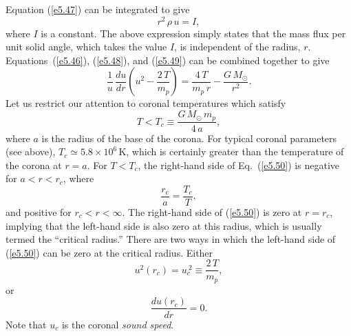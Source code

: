 Equation (\ref{e5.47}) can be integrated to give
\begin{equation}\label{e5.49}
r^2\,\rho\,u = I,
\end{equation}
where $I$ is a constant. The above expression simply states that the mass flux per
unit solid angle, which takes the value $I$, is independent of the radius, $r$.
Equations~(\ref{e5.46}), (\ref{e5.48}), and (\ref{e5.49}) can be combined together to give
\begin{equation}\label{e5.50}
\frac{1}{u} \,\frac{du}{dr}\left(u^2 - \frac{2\,T}{m_p}\right)
= \frac{4\,T}{m_p\,r} - \frac{G\,M_\odot}{r^2}.
\end{equation}
Let us restrict our attention to coronal temperatures which satisfy
\begin{equation}\label{e5.51}
T < T_c \equiv \frac{G\,M_\odot\,m_p}{4\,a},
\end{equation}
where $a$ is the radius of the base of the corona. For typical
coronal parameters (see above), $T_c\simeq 5.8\times 10^6$\,K, which
is certainly greater than the temperature of the corona at $r=a$. For
$T<T_c$, the right-hand side of Eq.~(\ref{e5.50}) is negative for
$a<r<r_c$, where
\begin{equation}\label{e5.52}
\frac{r_c}{a} = \frac{T_c}{T},
\end{equation}
and positive for $r_c<r<\infty$. The right-hand side of (\ref{e5.50}) is zero at
$r=r_c$, implying that the left-hand side is also zero
at this radius, which is usually termed the ``critical radius.''
There are two ways in which the left-hand side of (\ref{e5.50}) can be zero at the critical
radius. Either
\begin{equation}\label{e5.53}
u^2(r_c) = u_c^{~2} \equiv \frac{2\,T}{m_p},
\end{equation}
or
\begin{equation}\label{e5.54}
\frac{du(r_c)}{dr} = 0.
\end{equation}
Note that $u_c$ is the coronal {\em sound speed}. 

